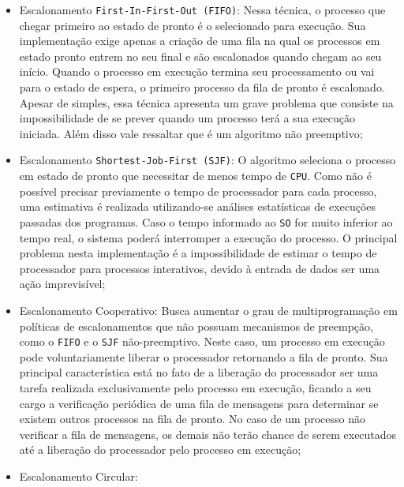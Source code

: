\begin{itemize}

	\item Escalonamento \texttt{First-In-First-Out (FIFO)}:
Nessa técnica, o processo que chegar primeiro ao estado de pronto é o selecionado para execução. Sua implementação exige apenas a criação de uma fila na qual os processos em estado pronto entrem no seu final e são escalonados quando chegam ao seu início. Quando o processo em execução termina seu processamento ou vai para o estado de espera, o primeiro processo da fila de pronto é escalonado. Apesar de simples, essa técnica apresenta um grave problema que consiste na impossibilidade de se prever quando um processo terá a sua execução iniciada. Além disso vale ressaltar que é um algoritmo não preemptivo;
	\item Escalonamento \texttt{Shortest-Job-First (SJF)}:
O algoritmo seleciona o processo em estado de pronto que necessitar de menos tempo de \texttt{CPU}. Como não é possível precisar previamente o tempo de processador para cada processo, uma estimativa é realizada utilizando-se análises estatísticas de execuções passadas dos programas. Caso o tempo informado ao \texttt{SO} for muito inferior ao tempo real, o sistema poderá interromper a execução do processo. O principal problema nesta implementação é a impossibilidade de estimar o tempo de processador para processos interativos, devido à entrada de dados ser uma ação imprevisível;
	\item Escalonamento Cooperativo:
Busca aumentar o grau de multiprogramação em políticas de escalonamentos que não possuam mecanismos de preempção, como o \texttt{FIFO} e o \texttt{SJF} não-preemptivo. Neste caso, um processo em execução pode voluntariamente liberar o processador retornando a fila de pronto. Sua principal característica está no fato de a liberação do processador ser uma tarefa realizada exclusivamente pelo processo em execução, ficando a seu cargo a verificação periódica de uma fila de mensagens para determinar se existem outros processos na fila de pronto. No caso de um processo não verificar a fila de mensagens, os demais não terão chance de serem executados até a liberação do processador pelo processo em execução;
	\item Escalonamento Circular:

\end{itemize}
